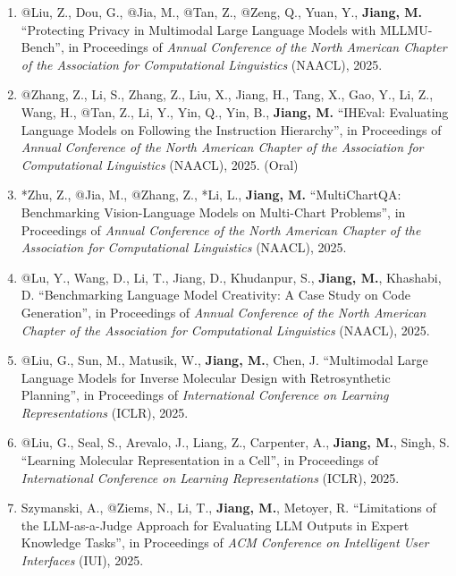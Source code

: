 \documentclass[10pt]{article}
\newenvironment{myindentpar}[1]%
{\begin{list}{}%
         {\setlength{\leftmargin}{#1}}%
         \item[]%
}
{\end{list}}
\newcounter{list}
\begin{document}
\begin{myindentpar}{0.00cm}
\begin{enumerate}[leftmargin=.5cm]
\item[C109] @Liu, Z., Dou, G., @Jia, M., @Tan, Z., @Zeng, Q., Yuan, Y., \textbf{Jiang, M.} ``Protecting Privacy in Multimodal Large Language Models with MLLMU-Bench'', in Proceedings of \textit{Annual Conference of the North American Chapter of the Association for Computational Linguistics} (NAACL), 2025.

\item[C108] @Zhang, Z., Li, S., Zhang, Z., Liu, X., Jiang, H., Tang, X., Gao, Y., Li, Z., Wang, H., @Tan, Z., Li, Y., Yin, Q., Yin, B., \textbf{Jiang, M.} ``IHEval: Evaluating Language Models on Following the Instruction Hierarchy'', in Proceedings of \textit{Annual Conference of the North American Chapter of the Association for Computational Linguistics} (NAACL), 2025. (Oral)

\item[C107] *Zhu, Z., @Jia, M., @Zhang, Z., *Li, L., \textbf{Jiang, M.} ``MultiChartQA: Benchmarking Vision-Language Models on Multi-Chart Problems'', in Proceedings of \textit{Annual Conference of the North American Chapter of the Association for Computational Linguistics} (NAACL), 2025.

\item[C106] @Lu, Y., Wang, D., Li, T., Jiang, D., Khudanpur, S., \textbf{Jiang, M.}, Khashabi, D. ``Benchmarking Language Model Creativity: A Case Study on Code Generation'', in Proceedings of \textit{Annual Conference of the North American Chapter of the Association for Computational Linguistics} (NAACL), 2025.

\item[C105] @Liu, G., Sun, M., Matusik, W., \textbf{Jiang, M.}, Chen, J. ``Multimodal Large Language Models for Inverse Molecular Design with Retrosynthetic Planning'', in Proceedings of \textit{International Conference on Learning Representations} (ICLR), 2025.

\item[C104] @Liu, G., Seal, S., Arevalo, J., Liang, Z., Carpenter, A., \textbf{Jiang, M.}, Singh, S. ``Learning Molecular Representation in a Cell'', in Proceedings of \textit{International Conference on Learning Representations} (ICLR), 2025.
		
\item[C103] Szymanski, A., @Ziems, N., Li, T., \textbf{Jiang, M.}, Metoyer, R. ``Limitations of the LLM-as-a-Judge Approach for Evaluating LLM Outputs in Expert Knowledge Tasks'', in Proceedings of \textit{ACM Conference on Intelligent User Interfaces} (IUI), 2025.


\end{enumerate}
\end{myindentpar}
\end{document}
